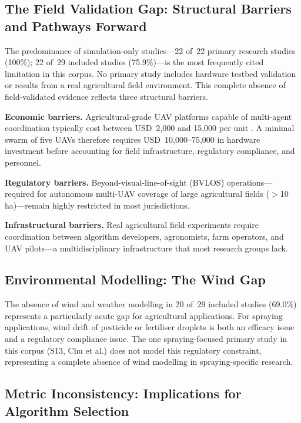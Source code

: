 \documentclass[review,3p]{elsarticle}
\begin{document}
\subsection{The Field Validation Gap: Structural Barriers and Pathways Forward}
\label{subsec:field_validation_gap}

The predominance of simulation-only studies---22 of~22 primary research studies
(100\%); 22 of~29 included studies (75.9\%)---is the most frequently cited
limitation in this corpus. No primary study includes hardware testbed validation
or results from a real agricultural field environment. This complete absence of
field-validated evidence reflects three structural barriers.

\textbf{Economic barriers.} Agricultural-grade UAV platforms capable of
multi-agent coordination typically cost between USD~2{,}000 and 15{,}000 per
unit \cite{phung2021}. A minimal swarm of five UAVs therefore requires
USD~10{,}000--75{,}000 in hardware investment before accounting for field
infrastructure, regulatory compliance, and personnel.

\textbf{Regulatory barriers.} Beyond-visual-line-of-sight (BVLOS)
operations---required for autonomous multi-UAV coverage of large agricultural
fields ($>$10\,ha)---remain highly restricted in most jurisdictions.

\textbf{Infrastructural barriers.} Real agricultural field experiments require
coordination between algorithm developers, agronomists, farm operators, and UAV
pilots---a multidisciplinary infrastructure that most research groups lack.

\subsection{Environmental Modelling: The Wind Gap}
\label{sec:envmodel}

The absence of wind and weather modelling in 20 of~29 included studies (69.0\%)
represents a particularly acute gap for agricultural applications. For spraying
applications, wind drift of pesticide or fertiliser droplets is both an efficacy
issue and a regulatory compliance issue. The one spraying-focused primary study
in this corpus (S13, Chu et al.) does not model this regulatory constraint,
representing a complete absence of wind modelling in spraying-specific research.

\subsection{Metric Inconsistency: Implications for Algorithm Selection}
\label{sec:metrics_disc}
\end{document}
